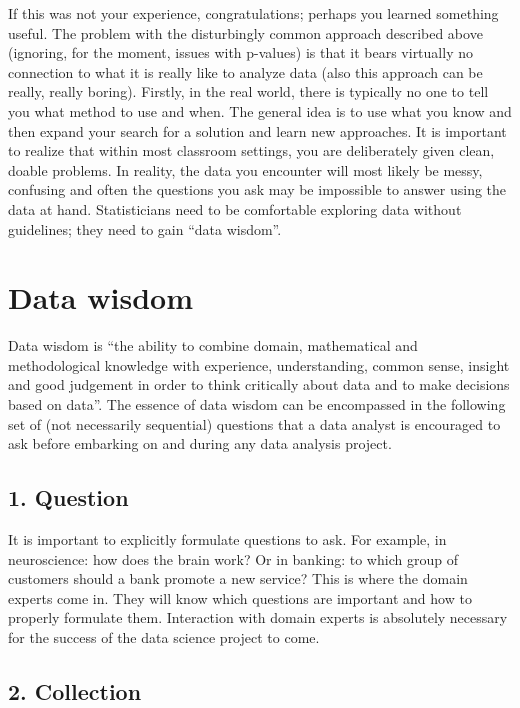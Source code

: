 If this was not your experience, congratulations; perhaps you learned something useful. The problem with the disturbingly common approach described above (ignoring, for the moment, issues with p-values) is that it bears virtually no connection to what it is really like to analyze data (also this approach can be really, really boring). Firstly, in the real world, there is typically no one to tell you what method to use and when. The general idea is to use what you know and then expand your search for a solution and learn new approaches. It is important to realize that within most classroom settings, you are deliberately given clean, doable problems. In reality, the data you encounter will most likely be messy, confusing and often the questions you ask may be impossible to answer using the data at hand. Statisticians need to be comfortable exploring data without guidelines; they need to gain ``data wisdom''.





\section{Data wisdom}

Data wisdom is ``the ability to combine domain, mathematical and methodological knowledge with experience, understanding, common sense, insight and good judgement in order to think critically about data and to make decisions based on data''. The essence of data wisdom can be encompassed in the following set of (not necessarily sequential) questions that a data analyst is encouraged to ask before embarking on and during any data analysis project.

\subsection*{1. Question}

It is important to explicitly formulate questions to ask. For example, in neuroscience: how does the brain work? Or in banking: to which group of customers should a bank promote a new service? This is where the domain experts come in. They will know which questions are important and how to properly formulate them. Interaction with domain experts is absolutely necessary for the success of the data science project to come.

\subsection*{2. Collection}

